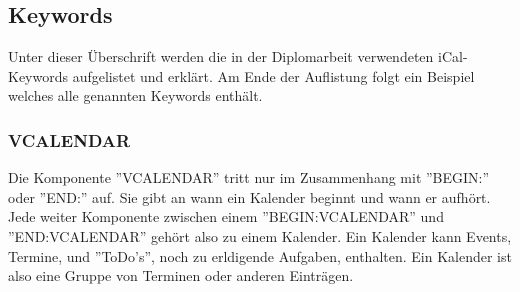  
\pagebreak
\renewcommand{\theauthor}{Dario Wagner}
\subsection{Keywords}
\label{sec:keywords}
Unter dieser Überschrift werden die in der Diplomarbeit verwendeten iCal-Keywords aufgelistet und erklärt. Am Ende der Auflistung folgt ein Beispiel welches alle genannten Keywords enthält. 
\subsubsection{VCALENDAR}
\label{sec:vCalendar} 
Die Komponente ''VCALENDAR'' tritt nur im Zusammenhang mit ''BEGIN:'' oder ''END:'' auf. Sie gibt an wann ein Kalender beginnt und wann er aufhört. Jede weiter Komponente zwischen einem ''BEGIN:VCALENDAR'' und ''END:VCALENDAR'' gehört also zu einem Kalender. Ein Kalender kann Events, Termine, und ''ToDo's'', noch zu erldigende Aufgaben, enthalten. Ein Kalender ist also eine Gruppe von Terminen oder anderen Einträgen. 
